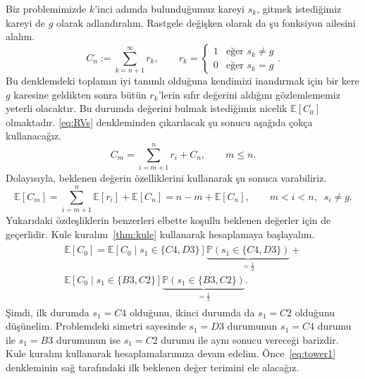 Biz problemimizde $k$'inci ad{\i}mda bulundu\u{g}umuz kareyi $s_k$, gitmek
istedi\u{g}imiz kareyi de $g$ olarak adland{\i}ral{\i}m. Rastgele
de\u{g}i\c{s}ken olarak da \c{s}u fonksiyon ailesini alal{\i}m.
\begin{equation}
    C_n := \sum_{k=n+1}^\infty r_k, \qquad r_k = 
\begin{cases}
    1 & \mbox{e\u{g}er } s_k \neq g \\
    0 & \mbox{e\u{g}er } s_k = g
\end{cases}.
\label{eq:RVs}
\end{equation}
Bu denklemdeki toplam{\i}n iyi tan{\i}ml{\i} oldu\u{g}una kendimizi
inand{\i}rmak i\c{c}in bir kere $g$ karesine geldikten sonra b\"{u}t\"{u}n
$r_k$'lerin s{\i}f{\i}r de\u{g}erini ald{\i}\u{g}{\i}n{\i} g\"{o}zlemlememiz
yeterli olacakt{\i}r. Bu durumda de\u{g}erini bulmak istedi\u{g}imiz nicelik
$\mathbb{E}[C_0]$ olmaktad{\i}r. \eqref{eq:RVs} denkleminden
\c{c}{\i}kar{\i}lacak \c{s}u sonucu a\c{s}a\u{g}{\i}da \c{c}ok\c{c}a
kullanaca\u{g}{\i}z.
\begin{equation*} 
    C_m = \sum_{i=m+1}^n r_i + C_n, \qquad m \leq n.
\end{equation*}
Dolay{\i}s{\i}yla, beklenen de\u{g}erin \"{o}zelliklerini kullanarak \c{s}u
sonuca varabiliriz.
\begin{equation*} 
    \mathbb{E}[C_m] = \sum_{i=m+1}^n \mathbb{E}[r_i] + \mathbb{E}[C_n] = n-m + \mathbb{E}[C_n],
    \qquad m < i < n, \;\; s_i \neq g.
\end{equation*}
Yukar{\i}daki \"{o}zde\c{s}liklerin benzerleri elbette ko\c{s}ullu beklenen
de\u{g}erler i\c{c}in de ge\c{c}erlidir. Kule kural{\i}n{\i}~\ref{thm:kule}
kullanarak hesaplamaya ba\c{s}layal{\i}m.
%
\begin{align}
    \begin{split}
    \mathbb{E}[C_0] = \mathbb{E}\left[ C_0 \mid s_1 \in \{C4, D3\} \right] 
    \underbrace{\mathbb{P}(s_1 \in \{C4, D3\})}_{=\frac{1}{2}} + \\ 
    \mathbb{E}\left[ C_0 \mid s_1 \in \{B3, C2\} 
    \right] \underbrace{\mathbb{P}(s_1 \in \{B3, C2\})}_{=\frac{1}{2}}.
    \end{split}
    \label{eq:tower1}
\end{align}
%
\c{S}imdi, ilk durumda $s_1 = C4$ oldu\u{g}unu, ikinci durumda da $s_1 = C2$
oldu\u{g}unu d\"{u}\c{s}\"{u}nelim. Problemdeki simetri sayesinde $s_1 = D3$
durumunun $s_1 = C4$ durumu ile $s_1 = B3$ durumunun ise $s_1 = C2$ durumu ile
ayn{\i} sonucu verece\u{g}i barizdir. Kule kural{\i}n{\i} kullanarak
hesaplamalar{\i}m{\i}za devam edelim. \"{O}nce~\eqref{eq:tower1} denkleminin
sa\u{g} taraf{\i}ndaki ilk beklenen de\u{g}er terimini ele alaca\u{g}{\i}z.

